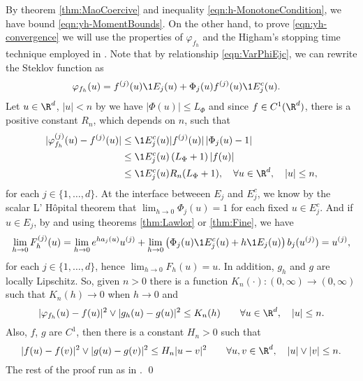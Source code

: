 \begin{pf}
	By theorem \ref{thm:MaoCoercive} and inequality \eqref{eqn:h-MonotoneCondition}, 
	we have	 bound \eqref{eqn:yh-MomentBounds}.
	On the other hand, to prove \eqref{eqn:yh-convergence} we will use the properties of 
	$\varphi_{f_h}$ and the Higham's stopping time technique employed in \cite[Thm 2.2]{Higham2002b}. 
	Note that by relationship \eqref{eqn:VarPhiEjc}, we can rewrite the Steklov function  as
	\begin{align}\label{fo}
		\varphi_{f_h}(u) 
			&=  f^{(j)}(u) \1{E_j}(u) +\Phi_j(u) f^{(j)}(u) \1{E_j^c}(u) .
	\end{align}
	 Let $u\in \R^d$, $|u|<n$ by  we have $|\Phi(u)|\leq L_{\Phi}$ and since $f \in C^1(\R^d)$, there is a 
	 positive  constant $R_n$, which depends on $n$, such that 
	\begin{align*}	
		|\varphi_{f_h}^{(j)}(u) - f^{(j)}(u)|
		&\leq
			\1{E_j^c}(u)
			|f^{(j)}(u)|
			\left|
				\Phi_j(u) - 1
			\right| \notag \\
		&\leq
			\1{E_j^c}(u)
			\left(
				L_{\Phi} + 1
			\right)
			|f(u)|	 \notag \\
		&\leq
		\1{E_j^c}(u) R_n(L_{\Phi}+1), \quad \forall u \in \R^d, \quad |u|\leq n,
	\end{align*}
	for each $j\in \{1,\dots, d\}$. At the interface betweeen $E_j$ and $E_j^c$, 
	we know by the scalar L' H\^{o}pital theorem that 
	$ \lim_{h\to 0} \Phi_j(u) = 1$ for each fixed $u\in E_j^c$.
	And if $u\in E_j$,  by  and using   
	theorems \ref{thm:Lawlor} or \ref{thm:Fine}, we have 
	\begin{equation*}
	\lim_{h \to 0} F_h^{(j)}(u)
		=
		\lim_{h \to 0}
			e^{ha_j(u)} u^{(j)} + 
		\lim_{h \to 0}
			\left( \Phi_j(u)
				\1{E_j^c}(u)
				+h \1{E_j}(u)
			\right)
			b_j(u^{(j)}) 
		= u^{(j)},
	\end{equation*}
	for each $j \in \{1, \dots , d\}$, hence
	$%
		\displaystyle
		\lim_{h\to 0} F_h(u)=u.
	$ %
	In addition, $g_h$ and $g$ are locally Lipschitz. So, given $n>0$ there is  a function 
	$K_n(\cdot):(0,\infty)\to (0,\infty)$ such that
	$K_n(h)\to 0$ when $h \to 0$ and
	\begin{equation}\label{eqn:PhihGhKRhBound}
		|\varphi_{f_h}(u)-f(u)|^2 \vee |g_h(u)-g(u)|^2
		\leq K_n(h) \qquad \forall u\in \R^d, \quad |u| \leq n.
	\end{equation}
	Also, $f$, $g$ are $C^{1}$, then there is  a constant $H_n>0$ such that
	\begin{equation}\label{eqn:f-gHRBound}
		|f(u)-f(v)|^2 \vee |g(u)-g(v)|^2
		\leq H_n |u-v|^2\qquad \forall u,v \in \R^d, \quad|u|\vee |v| \leq n.
	\end{equation}
	The rest of the proof run as in \citep[Lem. 3.6]{Higham2002b}. \qed
\end{pf}


